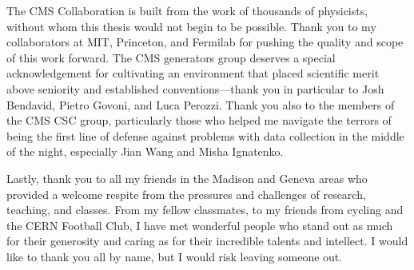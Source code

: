The CMS Collaboration is built from the work of thousands of physicists,
without whom this thesis would not begin to be possible. Thank you to
my collaborators at MIT, Princeton, and Fermilab for pushing the quality
and scope of this work forward.
The CMS generators group deserves a special acknowledgement
for cultivating an environment that placed scientific merit above
seniority and established conventions---thank you in particular to Josh
Bendavid, Pietro Govoni, and Luca Perozzi. 
Thank you also to the members of the CMS CSC group, particularly those
who helped me navigate the terrors of being the first line of defense
against problems with data collection in the middle of the night,
especially Jian Wang and Misha Ignatenko.

Lastly, thank you to all my friends in the Madison and Geneva areas
who provided a welcome respite from the pressures and challenges of
research, teaching, and classes. From my fellow classmates, to my friends from cycling and
the CERN Football Club, I have met wonderful people who stand out
as much for their generosity and caring as for their incredible talents
and intellect. I would like to thank you all by name, but I would
risk leaving someone out.
